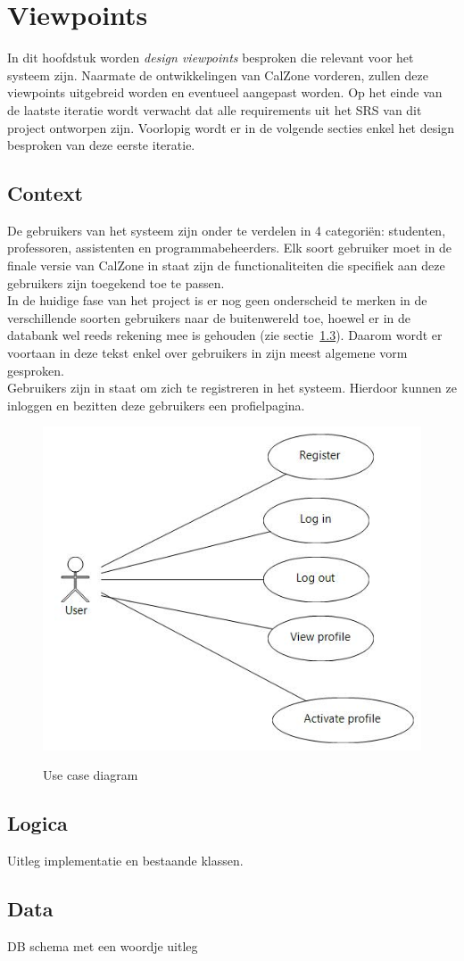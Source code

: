 \chapter{Viewpoints}
\label{chap:viewpoints}
In dit hoofdstuk worden \emph{design viewpoints} besproken die relevant voor het systeem zijn. Naarmate de ontwikkelingen van CalZone vorderen, zullen deze viewpoints uitgebreid worden en eventueel aangepast worden. Op het einde van de laatste iteratie wordt verwacht dat alle requirements uit het SRS van dit project ontworpen zijn. Voorlopig wordt er in de volgende secties enkel het design besproken van deze eerste iteratie.

\section{Context}
\label{sec:context}
De gebruikers van het systeem zijn onder te verdelen in 4 categori\"{e}n: studenten, professoren, assistenten en programmabeheerders. Elk soort gebruiker moet in de finale versie van CalZone in staat zijn de functionaliteiten die specifiek aan deze gebruikers zijn toegekend toe te passen. 
\\
In de huidige fase van het project is er nog geen onderscheid te merken in de verschillende soorten gebruikers naar de buitenwereld toe, hoewel er in de databank wel reeds rekening mee is gehouden (zie sectie~\ref{sec:data}). Daarom wordt er voortaan in deze tekst enkel over gebruikers in zijn meest algemene vorm gesproken.
\\
Gebruikers zijn in staat om zich te registreren in het systeem. Hierdoor kunnen ze inloggen en bezitten deze gebruikers een profielpagina. 

\begin{figure}[H]
	\centering
	\includegraphics[scale=0.5]{design/papyrus/use_cases.jpg}
	\label{fig:usecase}
	\caption{Use case diagram}
	
\end{figure}

\section{Logica}
\label{sec:logica}
Uitleg implementatie en bestaande klassen.

\section{Data}
\label{sec:data}
DB schema met een woordje uitleg
